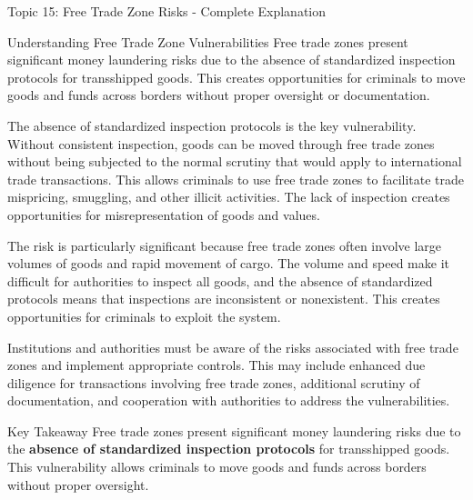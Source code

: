 \documentclass[8pt]{beamer}  %
\begin{document}
	\begin{frame}{Topic 15: Free Trade Zone Risks - Complete Explanation}
		\begin{block}{\large Understanding Free Trade Zone Vulnerabilities}
			Free trade zones present significant money laundering risks due to the absence of standardized inspection protocols for transshipped goods. This creates opportunities for criminals to move goods and funds across borders without proper oversight or documentation.
			
			The absence of standardized inspection protocols is the key vulnerability. Without consistent inspection, goods can be moved through free trade zones without being subjected to the normal scrutiny that would apply to international trade transactions. This allows criminals to use free trade zones to facilitate trade mispricing, smuggling, and other illicit activities. The lack of inspection creates opportunities for misrepresentation of goods and values.
			
			The risk is particularly significant because free trade zones often involve large volumes of goods and rapid movement of cargo. The volume and speed make it difficult for authorities to inspect all goods, and the absence of standardized protocols means that inspections are inconsistent or nonexistent. This creates opportunities for criminals to exploit the system.
			
			Institutions and authorities must be aware of the risks associated with free trade zones and implement appropriate controls. This may include enhanced due diligence for transactions involving free trade zones, additional scrutiny of documentation, and cooperation with authorities to address the vulnerabilities.
		\end{block}
		
		\begin{alertblock}{Key Takeaway}
			Free trade zones present significant money laundering risks due to the \textbf{absence of standardized inspection protocols} for transshipped goods. This vulnerability allows criminals to move goods and funds across borders without proper oversight.
		\end{alertblock}
	\end{frame}
	
\end{document}
